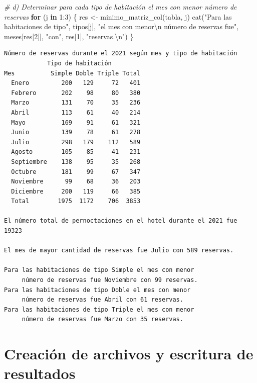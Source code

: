 \documentclass[
]{book}
\newenvironment{Shaded}{\begin{snugshade}}{\end{snugshade}}
\newcommand{\CommentTok}[1]{\textcolor[rgb]{0.56,0.35,0.01}{\textit{#1}}}
\newcommand{\ControlFlowTok}[1]{\textcolor[rgb]{0.13,0.29,0.53}{\textbf{#1}}}
\newcommand{\DecValTok}[1]{\textcolor[rgb]{0.00,0.00,0.81}{#1}}
\newcommand{\FunctionTok}[1]{\textcolor[rgb]{0.00,0.00,0.00}{#1}}
\newcommand{\NormalTok}[1]{#1}
\newcommand{\OtherTok}[1]{\textcolor[rgb]{0.56,0.35,0.01}{#1}}
\newcommand{\SpecialCharTok}[1]{\textcolor[rgb]{0.00,0.00,0.00}{#1}}
\newcommand{\StringTok}[1]{\textcolor[rgb]{0.31,0.60,0.02}{#1}}
\begin{document}
\begin{Shaded}
\begin{Highlighting}[]
\CommentTok{\# d) Determinar para cada tipo de habitación el mes con menor número de reservas}
\ControlFlowTok{for}\NormalTok{ (j }\ControlFlowTok{in} \DecValTok{1}\SpecialCharTok{:}\DecValTok{3}\NormalTok{) \{}
\NormalTok{    res }\OtherTok{\textless{}{-}} \FunctionTok{minimo\_matriz\_col}\NormalTok{(tabla, j)}
    \FunctionTok{cat}\NormalTok{(}\StringTok{"Para las habitaciones de tipo"}\NormalTok{, tipos[j], }
        \StringTok{"el mes con menor}\SpecialCharTok{\textbackslash{}n}\StringTok{     número de reservas fue"}\NormalTok{, }
\NormalTok{        meses[res[}\DecValTok{2}\NormalTok{]], }\StringTok{"con"}\NormalTok{, res[}\DecValTok{1}\NormalTok{], }\StringTok{"reservas.}\SpecialCharTok{\textbackslash{}n}\StringTok{"}\NormalTok{)}
\NormalTok{\}}
\end{Highlighting}
\end{Shaded}

\begin{verbatim}
Número de reservas durante el 2021 según mes y tipo de habitación
            Tipo de habitación
Mes          Simple Doble Triple Total
  Enero         200   129     72   401
  Febrero       202    98     80   380
  Marzo         131    70     35   236
  Abril         113    61     40   214
  Mayo          169    91     61   321
  Junio         139    78     61   278
  Julio         298   179    112   589
  Agosto        105    85     41   231
  Septiembre    138    95     35   268
  Octubre       181    99     67   347
  Noviembre      99    68     36   203
  Diciembre     200   119     66   385
  Total        1975  1172    706  3853

El número total de pernoctaciones en el hotel durante el 2021 fue 19323 

El mes de mayor cantidad de reservas fue Julio con 589 reservas.

Para las habitaciones de tipo Simple el mes con menor
     número de reservas fue Noviembre con 99 reservas.
Para las habitaciones de tipo Doble el mes con menor
     número de reservas fue Abril con 61 reservas.
Para las habitaciones de tipo Triple el mes con menor
     número de reservas fue Marzo con 35 reservas.
\end{verbatim}

\hypertarget{creaciuxf3n-de-archivos-y-escritura-de-resultados}{%
\section{Creación de archivos y escritura de resultados}\label{creaciuxf3n-de-archivos-y-escritura-de-resultados}}
\end{document}
